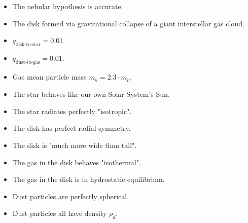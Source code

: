     \begin{itemize}
        \item The nebular hypothesis is accurate. 
        \item The disk formed via gravitational collapse of a giant interstellar gas cloud.
        \item $q_\text{disk-to-star}=0.01$.
        \item $q_\text{dust-to-gas}=0.01$.
        \item Gas mean particle mass $m_g=2.3\cdot m_p$.
        \item The star behaves like our own Solar System's Sun.
        \item The star radiates perfectly "isotropic".
        \item The disk has perfect radial symmetry.
        \item The disk is "much more wide than tall".
        \item The gas in the disk behaves "isothermal".
        \item The gas in the disk is in hydrostatic equilibrium.
        \item Dust particles are perfectly spherical.
        \item Dust particles all have density $\rho_d$.
    \end{itemize}

